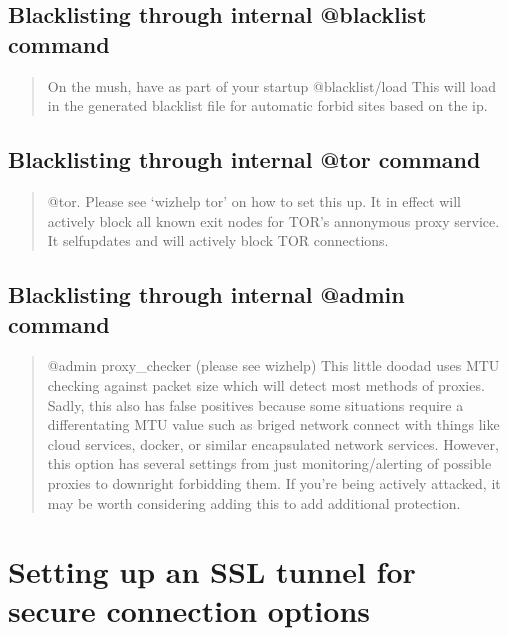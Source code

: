 \documentclass[letterpaper,10pt,english]{sphinxmanual}
\begin{document}
\subsection{Blacklisting through internal @blacklist command}
\label{\detokenize{security:blacklisting-through-internal-blacklist-command}}\begin{quote}

\sphinxAtStartPar
On the mush, have as part of your startup @blacklist/load
This will load in the generated blacklist file for automatic forbid
sites based on the ip.
\end{quote}


\subsection{Blacklisting through internal @tor command}
\label{\detokenize{security:blacklisting-through-internal-tor-command}}\begin{quote}

\sphinxAtStartPar
@tor.  Please see ‘wizhelp tor’ on how to set this up.  It in effect
will actively block all known exit nodes for TOR’s annonymous proxy
service.  It self\sphinxhyphen{}updates and will actively block TOR connections.
\end{quote}


\subsection{Blacklisting through internal @admin command}
\label{\detokenize{security:blacklisting-through-internal-admin-command}}\begin{quote}

\sphinxAtStartPar
@admin proxy\_checker (please see wizhelp)
This little doodad uses MTU checking against packet size which will
detect most methods of proxies.  Sadly, this also has false positives
because some situations require a differentating MTU value such as
briged network connect with things like cloud services, docker, or
similar encapsulated network services.  However, this option has
several settings from just monitoring/alerting of possible proxies
to downright forbidding them.  If you’re being actively attacked,
it may be worth considering adding this to add additional protection.
\end{quote}


\section{Setting up an SSL tunnel for secure connection options}
\label{\detokenize{security:setting-up-an-ssl-tunnel-for-secure-connection-options}}
\end{document}
